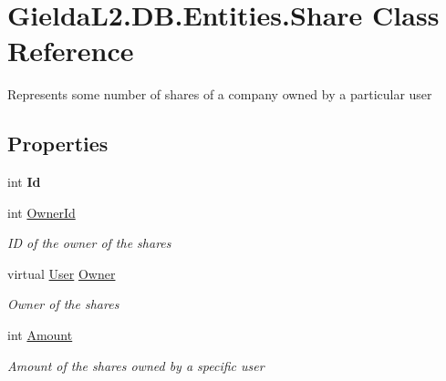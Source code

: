 \hypertarget{class_gielda_l2_1_1_d_b_1_1_entities_1_1_share}{}\section{Gielda\+L2.\+D\+B.\+Entities.\+Share Class Reference}
\label{class_gielda_l2_1_1_d_b_1_1_entities_1_1_share}


Represents some number of shares of a company owned by a particular user  


\subsection*{Properties}
\begin{DoxyCompactItemize}
\item 
\mbox{\label{class_gielda_l2_1_1_d_b_1_1_entities_1_1_share_ad96300d51d24b7675f6afc8a554cce9d}} 
int {\bfseries Id}
\item 
int \mbox{\hyperlink{class_gielda_l2_1_1_d_b_1_1_entities_1_1_share_ac7337a0376096943144bb77d197b2cfd}{Owner\+Id}}
\begin{DoxyCompactList}\small\item\em ID of the owner of the shares \end{DoxyCompactList}\item 
virtual \mbox{\hyperlink{class_gielda_l2_1_1_d_b_1_1_entities_1_1_user}{User}} \mbox{\hyperlink{class_gielda_l2_1_1_d_b_1_1_entities_1_1_share_ae2ad308ad36837a00e09d1bf49e6890b}{Owner}}
\begin{DoxyCompactList}\small\item\em Owner of the shares \end{DoxyCompactList}\item 
int \mbox{\hyperlink{class_gielda_l2_1_1_d_b_1_1_entities_1_1_share_a7090c17c53c51b579b138b3b08d3bf67}{Amount}}
\begin{DoxyCompactList}\small\item\em Amount of the shares owned by a specific user \end{DoxyCompactList}\item 

\end{DoxyCompactItemize}
